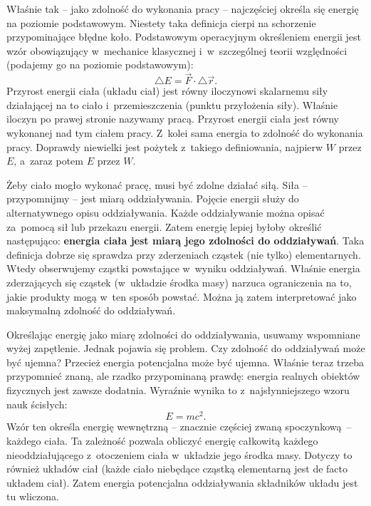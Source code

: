 Właśnie tak – jako zdolność do wykonania pracy – najczęściej określa się energię na poziomie podstawowym. Niestety taka definicja cierpi na schorzenie przypominające błędne koło. Podstawowym operacyjnym określeniem energii jest wzór obowiązujący w~mechanice klasycznej i~w~szczególnej teorii względności (podajemy go na poziomie podstawowym):
\begin{equation}\label{en}
\triangle E=\vec{F}\cdot\triangle\vec{r}.
\end{equation}
Przyrost energii ciała (układu ciał) jest równy iloczynowi skalarnemu siły działającej na to ciało i~przemieszczenia (punktu przyłożenia siły). Właśnie iloczyn po prawej stronie nazywamy pracą. Przyrost energii ciała jest równy wykonanej nad tym ciałem pracy. Z~kolei sama energia to zdolność do wykonania pracy. Doprawdy niewielki jest pożytek z~takiego definiowania, najpierw $W$ przez $E$, a~zaraz potem $E$ przez $W$.

Żeby ciało mogło wykonać pracę, musi być zdolne działać siłą. Siła – przypomnijmy -- jest miarą oddziaływania. Pojęcie energii służy do alternatywnego opisu oddziaływania. Każde oddziaływanie można opisać za~pomocą sił lub przekazu energii. Zatem energię lepiej byłoby określić następująco: { \bf energia ciała jest miarą jego zdolności do oddziaływań}. Taka definicja dobrze się sprawdza przy zderzeniach cząstek (nie tylko) elementarnych. Wtedy obserwujemy cząstki powstające w~wyniku oddziaływań. Właśnie energia zderzających się cząstek (w~układzie środka masy) narzuca ograniczenia na to, jakie produkty mogą w~ten sposób powstać. Można ją zatem interpretować jako maksymalną zdolność do oddziaływań.

Określając energię jako miarę zdolności do oddziaływania, usuwamy wspomniane wyżej zapętlenie. Jednak pojawia się problem. Czy zdolność do oddziaływań może być ujemna? Przecież energia potencjalna może być ujemna. Właśnie teraz trzeba przypomnieć znaną, ale rzadko przypominaną prawdę: energia realnych obiektów fizycznych jest zawsze dodatnia.
Wyraźnie wynika to z~najsłynniejszego wzoru nauk ścisłych:
\begin{equation}\label{emc}
  E=mc^2.
\end{equation}
Wzór ten określa energię wewnętrzną
-- znacznie częściej zwaną spoczynkową~– każdego ciała. Ta zależność pozwala obliczyć energię całkowitą każdego nieoddziałującego z~otoczeniem ciała w~układzie jego środka masy.  Dotyczy to również układów ciał (każde ciało niebędące cząstką elementarną jest de facto układem ciał). Zatem energia potencjalna oddziaływania składników układu jest tu wliczona.

